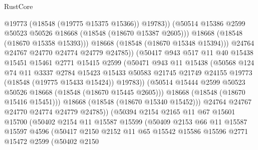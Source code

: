 \begin{lexlean}{RustCore}
\begin{coremodule}
                              @19773
                              (@18548 (@19775 @15375 @15366))
                              @19783))
                          (@50514 @15386 @2599 @50523 @50526 @18668 (@18548 (@18670 @15387 @2605)))
                          @18668
                          (@18548 (@18670 @15358 @15393)))
                        @18668
                        (@18548 (@18670 @15348 @15394)))
                      @24764
                      @24767
                      @24770
                      @24774
                      @24779
                      @24785))
                  (@50417
                    @943
                    @517
                    @11
                    @40
                    @15438
                    @15451
                    @15461
                    @2771
                    @15415
                    @2599
                    (@50471
                      @943
                      @11
                      @15438
                      (@50568
                        @124
                        @74
                        @11
                        @3337
                        @2784
                        @15423
                        @15433
                        @50583
                        @21745
                        @21749
                        @24155
                        @19773
                        (@18548 (@19775 @15433 @15424))
                        @19783))
                    (@50514 @15444 @2599 @50523 @50526 @18668 (@18548 (@18670 @15445 @2605)))
                    @18668
                    (@18548 (@18670 @15416 @15451)))
                  @18668
                  (@18548 (@18670 @15340 @15452)))
                @24764
                @24767
                @24770
                @24774
                @24779
                @24785))
            (@50394
              @2154
              @2165
              @11
              @67
              @15601
              @15700
              (@50402
                @2154
                @11
                @15587
                @15599
                (@50409
                  @2153
                  @66
                  @11
                  @15587
                  @15597
                  @4596
                  (@50417
                    @2150
                    @2152
                    @11
                    @65
                    @15542
                    @15586
                    @15596
                    @2771
                    @15472
                    @2599
                    (@50402
                      @2150

\end{coremodule}
\end{lexlean}
